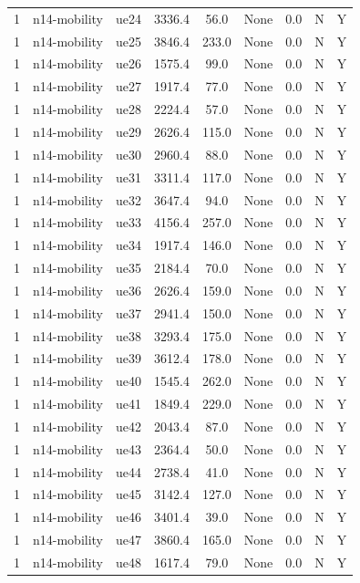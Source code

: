 \begin{table}[ht]
\begin{tabular}{|c|c|c|c|c|c|c|c|c|}
1 & n14-mobility & ue24 & 3336.4 & 56.0 & None & 0.0 & N & Y \\
1 & n14-mobility & ue25 & 3846.4 & 233.0 & None & 0.0 & N & Y \\
1 & n14-mobility & ue26 & 1575.4 & 99.0 & None & 0.0 & N & Y \\
1 & n14-mobility & ue27 & 1917.4 & 77.0 & None & 0.0 & N & Y \\
1 & n14-mobility & ue28 & 2224.4 & 57.0 & None & 0.0 & N & Y \\
1 & n14-mobility & ue29 & 2626.4 & 115.0 & None & 0.0 & N & Y \\
1 & n14-mobility & ue30 & 2960.4 & 88.0 & None & 0.0 & N & Y \\
1 & n14-mobility & ue31 & 3311.4 & 117.0 & None & 0.0 & N & Y \\
1 & n14-mobility & ue32 & 3647.4 & 94.0 & None & 0.0 & N & Y \\
1 & n14-mobility & ue33 & 4156.4 & 257.0 & None & 0.0 & N & Y \\
1 & n14-mobility & ue34 & 1917.4 & 146.0 & None & 0.0 & N & Y \\
1 & n14-mobility & ue35 & 2184.4 & 70.0 & None & 0.0 & N & Y \\
1 & n14-mobility & ue36 & 2626.4 & 159.0 & None & 0.0 & N & Y \\
1 & n14-mobility & ue37 & 2941.4 & 150.0 & None & 0.0 & N & Y \\
1 & n14-mobility & ue38 & 3293.4 & 175.0 & None & 0.0 & N & Y \\
1 & n14-mobility & ue39 & 3612.4 & 178.0 & None & 0.0 & N & Y \\
1 & n14-mobility & ue40 & 1545.4 & 262.0 & None & 0.0 & N & Y \\
1 & n14-mobility & ue41 & 1849.4 & 229.0 & None & 0.0 & N & Y \\
1 & n14-mobility & ue42 & 2043.4 & 87.0 & None & 0.0 & N & Y \\
1 & n14-mobility & ue43 & 2364.4 & 50.0 & None & 0.0 & N & Y \\
1 & n14-mobility & ue44 & 2738.4 & 41.0 & None & 0.0 & N & Y \\
1 & n14-mobility & ue45 & 3142.4 & 127.0 & None & 0.0 & N & Y \\
1 & n14-mobility & ue46 & 3401.4 & 39.0 & None & 0.0 & N & Y \\
1 & n14-mobility & ue47 & 3860.4 & 165.0 & None & 0.0 & N & Y \\
1 & n14-mobility & ue48 & 1617.4 & 79.0 & None & 0.0 & N & Y \\

\end{tabular}
\end{table}
